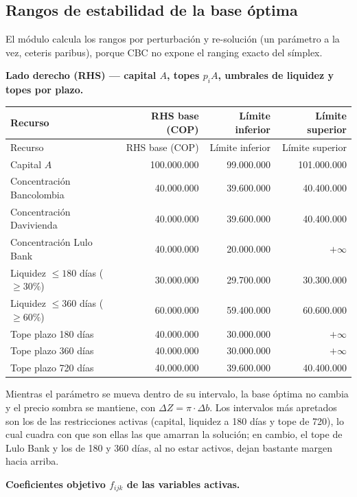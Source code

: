 \documentclass[11pt,a4paper]{article}
\begin{document}
\subsection{Rangos de estabilidad de la base óptima}

El módulo calcula los rangos por perturbación y re-solución (un parámetro a
la vez, ceteris paribus), porque CBC no expone el ranging exacto del símplex.

\textbf{Lado derecho (RHS) --- capital $A$, topes $p_i A$, umbrales de liquidez y topes
por plazo.}

\begin{longtable}{l r r r}
\toprule
Recurso & RHS base (COP) & Límite inferior & Límite superior \\
\midrule
\endfirsthead
\toprule
Recurso & RHS base (COP) & Límite inferior & Límite superior \\
\midrule
\endhead
Capital $A$ & 100.000.000 & 99.000.000 & 101.000.000 \\
Concentración Bancolombia & 40.000.000 & 39.600.000 & 40.400.000 \\
Concentración Davivienda & 40.000.000 & 39.600.000 & 40.400.000 \\
Concentración Lulo Bank & 40.000.000 & 20.000.000 & $+\infty$ \\
Liquidez $\le 180$ días ($\ge 30\%$) & 30.000.000 & 29.700.000 & 30.300.000 \\
Liquidez $\le 360$ días ($\ge 60\%$) & 60.000.000 & 59.400.000 & 60.600.000 \\
Tope plazo 180 días & 40.000.000 & 30.000.000 & $+\infty$ \\
Tope plazo 360 días & 40.000.000 & 30.000.000 & $+\infty$ \\
Tope plazo 720 días & 40.000.000 & 39.600.000 & 40.400.000 \\
\bottomrule
\end{longtable}

Mientras el parámetro se mueva dentro de su intervalo, la base óptima no cambia y el precio
sombra se mantiene, con $\Delta Z = \pi \cdot \Delta b$. Los intervalos más apretados son los de
las restricciones activas (capital, liquidez a 180 días y tope de 720), lo cual cuadra con que
son ellas las que amarran la solución; en cambio, el tope de Lulo Bank y los de 180 y 360 días,
al no estar activos, dejan bastante margen hacia arriba.

\textbf{Coeficientes objetivo $f_{ijk}$ de las variables activas.}
\end{document}
